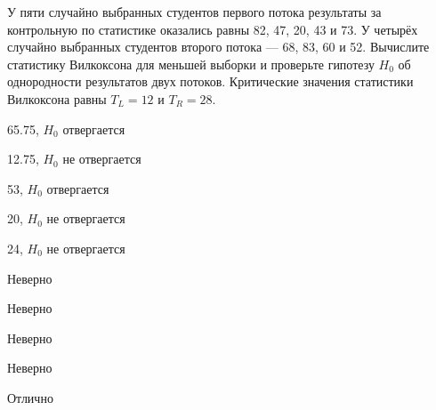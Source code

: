 
\begin{question}
У пяти случайно выбранных студентов первого потока результаты за
контрольную по статистике оказались равны 82, 47, 20, 43 и 73. У четырёх
случайно выбранных студентов второго потока --- 68, 83, 60 и 52.
Вычислите статистику Вилкоксона для меньшей выборки и проверьте гипотезу
\(H_0\) об однородности результатов двух потоков. Критические значения
статистики Вилкоксона равны \(T_L=12\) и \(T_R=28\).
\begin{answerlist}
  \item 65.75, \(H_0\) отвергается
  \item 12.75, \(H_0\) не отвергается
  \item 53, \(H_0\) отвергается
  \item 20, \(H_0\) не отвергается
  \item 24, \(H_0\) не отвергается
\end{answerlist}
\end{question}

\begin{solution}
\begin{answerlist}
  \item Неверно
  \item Неверно
  \item Неверно
  \item Неверно
  \item Отлично
\end{answerlist}
\end{solution}

